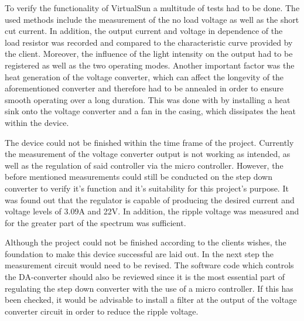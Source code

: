 \documentclass[a4paper]{fhnwreport}
\begin{document}
To verify the functionality of VirtualSun a multitude of tests had to be done. The used methods include the measurement of the no load voltage as well as the short cut current. In addition, the output current and voltage in dependence of the load resistor was recorded and compared to the characteristic curve provided by the client.  Moreover, the influence of the light intensity on the output had to be registered as well as the two operating modes. Another important factor was the heat generation of the voltage converter, which can affect the longevity of the aforementioned converter and therefore had to be annealed in order to ensure smooth operating over a long duration. This was done with by installing a heat sink onto the voltage converter and a fan in the casing, which dissipates the heat within the device.

The device could not be finished within the time frame of the project. Currently the measurement of the voltage converter output is not working as intended, as well as the regulation of said controller via the micro controller. However, the before mentioned measurements could still be conducted on the step down converter to verify it's function and it's suitability for this project's purpose. It was found out that the regulator is capable of producing the desired current and voltage levels of 3.09A and 22V. In addition, the ripple voltage was measured and for the greater part of the spectrum was sufficient.

Although the project could not be finished according to the clients wishes, the foundation to make this device successful are laid out. In the next step the measurement circuit would need to be revised. The software code which controls the DA-converter should also be reviewed since it is the most essential part of regulating the step down converter with the use of a micro controller. If this has been checked, it would be advisable to install a filter at the output of the voltage converter circuit in order to reduce the ripple voltage.

 
\end{document}
